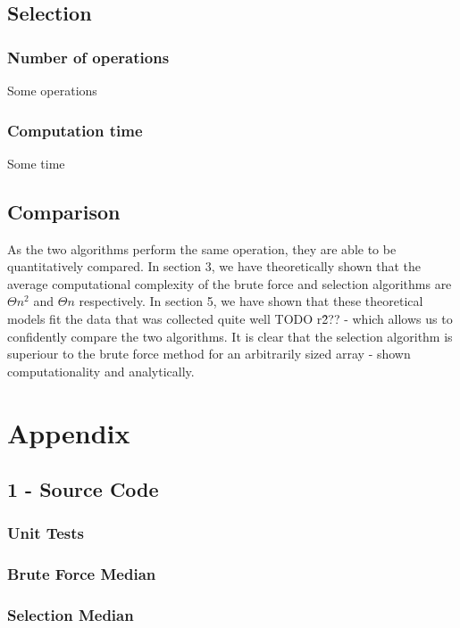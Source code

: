 \documentclass{article}
\begin{document}
    \subsection{Selection}
        \subsubsection{Number of operations}
            Some operations
        \subsubsection{Computation time}
            Some time


    \subsection{Comparison}
        As the two algorithms perform the same operation, they are able to be quantitatively compared. In section 3, we have theoretically shown that the average computational complexity of the brute force and selection algorithms are $\Theta{n^2}$ and $\Theta{n}$ respectively. In section 5, we have shown that these theoretical models fit the data that was collected quite well TODO r\^2?? - which allows us to confidently compare the two algorithms. It is clear that the selection algorithm is superiour to the brute force method for an arbitrarily sized array - shown computationality and analytically.

\section{Appendix}
    \subsection{1 - Source Code}
        \subsubsection{Unit Tests}
            

        \subsubsection{Brute Force Median}
            

        \subsubsection{Selection Median}
            
\end{document}
